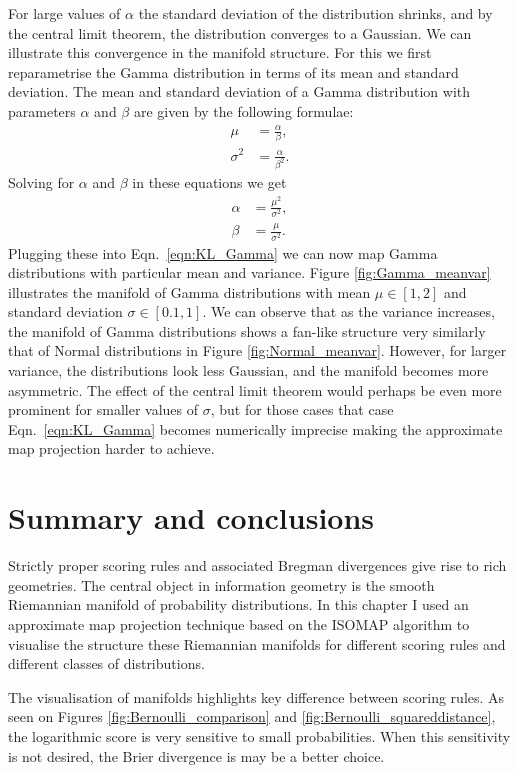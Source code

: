 For large values of $\alpha$ the standard deviation of the distribution shrinks, and by the central limit theorem, the distribution converges to a Gaussian. We can illustrate this convergence in the manifold structure. For this we first reparametrise the Gamma distribution in terms of its mean and standard deviation. The mean and standard deviation of a Gamma distribution with parameters $\alpha$ and $\beta$ are given by the following formulae:
%
\begin{align}
	\mu &= \frac{\alpha}{\beta},\\
	\sigma^2 &= \frac{\alpha}{\beta^2}.
\end{align}
%
Solving for $\alpha$ and $\beta$ in these equations we get
%
\begin{align}
	\alpha &= \frac{\mu^2}{\sigma^2},\\
	\beta &= \frac{\mu}{\sigma^2}.
\end{align}
%
Plugging these into Eqn.\ \eqref{eqn:KL_Gamma} we can now map Gamma distributions with particular mean and variance. Figure \ref{fig:Gamma_meanvar} illustrates the manifold of Gamma distributions with mean $\mu\in[1,2]$ and standard deviation $\sigma\in[0.1,1]$. We can observe that as the variance increases, the manifold of Gamma distributions shows a fan-like structure very similarly that of Normal distributions in Figure \ref{fig:Normal_meanvar}. However, for larger variance, the distributions look less Gaussian, and the manifold becomes more asymmetric. The effect of the central limit theorem would perhaps be even more prominent for smaller values of $\sigma$, but for those cases that case Eqn.\ \eqref{eqn:KL_Gamma} becomes numerically imprecise making the approximate map projection harder to achieve.

\section{Summary and conclusions}

Strictly proper scoring rules and associated Bregman divergences give rise to rich geometries. The central object in information geometry is the smooth Riemannian manifold of probability distributions. In this chapter I used an approximate map projection technique based on the ISOMAP algorithm to visualise the structure these Riemannian manifolds for different scoring rules and different classes of distributions.

The visualisation of manifolds highlights key difference between scoring rules. As seen on Figures \ref{fig:Bernoulli_comparison} and \ref{fig:Bernoulli_squareddistance}, the logarithmic score is very sensitive to small probabilities. When this sensitivity is not desired, the Brier divergence is may be a better choice.

